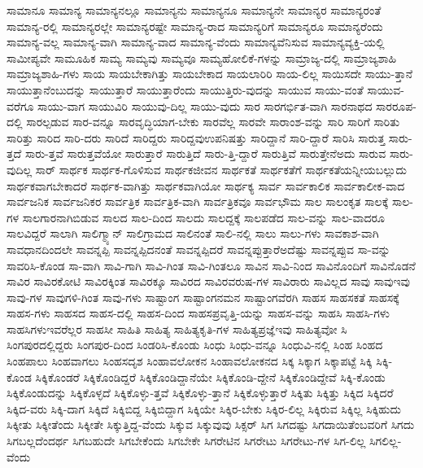 {ಸಾಮಾನೂ
ಸಾಮಾನ್ಯ
ಸಾಮಾನ್ಯನಲ್ಲೂ
ಸಾಮಾನ್ಯನು
ಸಾಮಾನ್ಯನೂ
ಸಾಮಾನ್ಯನೇ
ಸಾಮಾನ್ಯರ
ಸಾಮಾನ್ಯರಂತೆ
ಸಾಮಾನ್ಯ-ರಲ್ಲಿ
ಸಾಮಾನ್ಯರಲ್ಲೇ
ಸಾಮಾನ್ಯರಷ್ಟೇ
ಸಾಮಾನ್ಯ-ರಾದ
ಸಾಮಾನ್ಯರಿಗೆ
ಸಾಮಾನ್ಯರೂ
ಸಾಮಾನ್ಯರೆಂದು
ಸಾಮಾನ್ಯ-ವಲ್ಲ
ಸಾಮಾನ್ಯ-ವಾಗಿ
ಸಾಮಾನ್ಯ-ವಾದ
ಸಾಮಾನ್ಯ-ವೆಂದು
ಸಾಮಾನ್ಯವೆನಿಸುವ
ಸಾಮಾನ್ಯವ್ಯಕ್ತಿ-ಯಲ್ಲಿ
ಸಾಮೀಪ್ಯವೇ
ಸಾಮೂಹಿಕ
ಸಾಮ್ಯ
ಸಾಮ್ಯವು
ಸಾಮ್ಯವೂ
ಸಾಮ್ಯಹೋಲಿಕೆ-ಗಳನ್ನು
ಸಾಮ್ರಾಜ್ಯ-ದಲ್ಲಿ
ಸಾಮ್ರಾಜ್ಯಶಾಹಿ
ಸಾಮ್ರಾಜ್ಯಶಾಹಿ-ಗಳು
ಸಾಯ
ಸಾಯಬೇಕಾಗಿತ್ತು
ಸಾಯಬೇಕಾದ
ಸಾಯಲಾರಿರಿ
ಸಾಯ-ಲಿಲ್ಲ
ಸಾಯಿಸದೇ
ಸಾಯು-ತ್ತಾನೆ
ಸಾಯುತ್ತಾನೆಂಬುದನ್ನು
ಸಾಯುತ್ತಾರೆ
ಸಾಯುತ್ತಾರೆಂದು
ಸಾಯುತ್ತಿರು-ವುದನ್ನು
ಸಾಯುವ
ಸಾಯು-ವಂತೆ
ಸಾಯುವ-ವರೆಗೂ
ಸಾಯು-ವಾಗ
ಸಾಯುವಿರಿ
ಸಾಯುವು-ದಿಲ್ಲ
ಸಾಯು-ವುದು
ಸಾರ
ಸಾರಗರ್ಭಿತ-ವಾಗಿ
ಸಾರನಾಥದ
ಸಾರರೂಪ-ದಲ್ಲಿ
ಸಾರಲ್ಪಡುವ
ಸಾರ-ವನ್ನೂ
ಸಾರವೃದ್ಧಿಯಾಗ-ಬೇಕು
ಸಾರವೆಲ್ಲ
ಸಾರವೇ
ಸಾರಾಂಶ-ವನ್ನು
ಸಾರಿ
ಸಾರಿಗೆ
ಸಾರಿತು
ಸಾರಿತ್ತು
ಸಾರಿದ
ಸಾರಿ-ದರು
ಸಾರಿದೆ
ಸಾರಿದ್ದರು
ಸಾರಿದ್ದವುಉಪನಿಷತ್ತು
ಸಾರಿದ್ದಾನೆ
ಸಾರಿ-ದ್ದಾರೆ
ಸಾರಿಸಿ
ಸಾರುತ್ತ
ಸಾರು-ತ್ತದೆ
ಸಾರು-ತ್ತವೆ
ಸಾರುತ್ತವೆಯೋ
ಸಾರುತ್ತಾರೆ
ಸಾರುತ್ತಿದೆ
ಸಾರು-ತ್ತಿ-ದ್ದಾರೆ
ಸಾರುತ್ತಿವೆ
ಸಾರುತ್ತೇನೆಅದು
ಸಾರುವ
ಸಾರು-ವುದಿಲ್ಲ
ಸಾರ್
ಸಾರ್ಥಕ
ಸಾರ್ಥಕ-ಗೊಳಿಸುವ
ಸಾರ್ಥಕಜೀವನ
ಸಾರ್ಥಕತೆ
ಸಾರ್ಥಕತೆಗೆ
ಸಾರ್ಥಕತೆಯನ್ನೀಯಬಲ್ಲುದು
ಸಾರ್ಥಕವಾಗಬೇಕಾದರೆ
ಸಾರ್ಥಕ-ವಾಗಿತ್ತು
ಸಾರ್ಥಕವಾಗಿಯೋ
ಸಾರ್ಥಕ್ಯ
ಸಾರ್ವ
ಸಾರ್ವಕಾಲಿಕ
ಸಾರ್ವಕಾಲೀಕ-ವಾದ
ಸಾರ್ವಜನಿಕ
ಸಾರ್ವಜನಿಕರ
ಸಾರ್ವತ್ರಿಕ
ಸಾರ್ವತ್ರಿಕ-ವಾಗಿ
ಸಾರ್ವತ್ರಿಕವೂ
ಸಾರ್ವಭೌಮ
ಸಾಲ
ಸಾಲಂಕೃತ
ಸಾಲಕ್ಕೆ
ಸಾಲ-ಗಳ
ಸಾಲಗಾರನಾಗಿಬಿಡುವ
ಸಾಲದ
ಸಾಲ-ದಿಂದ
ಸಾಲದು
ಸಾಲದ್ದಕ್ಕೆ
ಸಾಲಪಡೆದ
ಸಾಲ-ವನ್ನು
ಸಾಲ-ವಾದರೂ
ಸಾಲವಿದ್ದರೆ
ಸಾಲಾಗಿ
ಸಾಲಿಗ್ಮ್ಯಾನ್
ಸಾಲಿಗ್ರಾಮದ
ಸಾಲಿನಂತೆ
ಸಾಲಿ-ನಲ್ಲಿ
ಸಾಲು
ಸಾಲು-ಗಳು
ಸಾವಕಾಶ-ವಾಗಿ
ಸಾವಧಾನದಿಂದಲೇ
ಸಾವನ್ನಪ್ಪಿ
ಸಾವನ್ನಪ್ಪಿದನಂತೆ
ಸಾವನ್ನಪ್ಪಿದರೆ
ಸಾವನ್ನಪ್ಪುತ್ತಾರೆಅದೆಷ್ಟು
ಸಾವನ್ನಪ್ಪುವ
ಸಾ-ವನ್ನು
ಸಾವರಿಸಿ-ಕೊಂಡ
ಸಾ-ವಾಗಿ
ಸಾವಿ-ಗಾಗಿ
ಸಾವಿ-ಗಿಂತ
ಸಾವಿ-ಗಿಂತಲೂ
ಸಾವಿನ
ಸಾವಿ-ನಿಂದ
ಸಾವಿನೊಂದಿಗೆ
ಸಾವಿನೊಡನೆ
ಸಾವಿರ
ಸಾವಿರಕೋಟಿ
ಸಾವಿರಕ್ಕಿಂತ
ಸಾವಿರಕ್ಕೂ
ಸಾವಿರದ
ಸಾವಿರವರುಷ-ಗಳ
ಸಾವಿರಾರು
ಸಾವಿಲ್ಲದ
ಸಾವು
ಸಾವುಇವು
ಸಾವು-ಗಳ
ಸಾವುಗಳಿ-ಗಿಂತ
ಸಾವು-ಗಳು
ಸಾಷ್ಟಾಂಗ
ಸಾಷ್ಟಾಂಗನಮನ
ಸಾಷ್ಟಾಂಗವೆರಗಿ
ಸಾಹಸ
ಸಾಹಸಕತೆ
ಸಾಹಸಕ್ಕೆ
ಸಾಹಸ-ಗಳು
ಸಾಹಸದ
ಸಾಹಸ-ದಲ್ಲಿ
ಸಾಹಸ-ದಿಂದ
ಸಾಹಸಪ್ರವೃತ್ತಿ-ಯನ್ನು
ಸಾಹಸ-ವನ್ನು
ಸಾಹಸಿ
ಸಾಹಸಿ-ಗಳು
ಸಾಹಸಿಗಳುಇವರೆಲ್ಲರ
ಸಾಹಸೀ
ಸಾಹಿತಿ
ಸಾಹಿತ್ಯ
ಸಾಹಿತ್ಯಕೃತಿ-ಗಳ
ಸಾಹಿತ್ಯಪ್ರಜ್ಞೆಇವು
ಸಾಹಿತ್ಯವೋ
ಸಿ
ಸಿಂಗಪುರದಲ್ಲಿದ್ದರು
ಸಿಂಗಪುರ-ದಿಂದ
ಸಿಂಡರಿಸಿ-ಕೊಂಡು
ಸಿಂಧು
ಸಿಂಧು-ವನ್ನೂ
ಸಿಂಧುವಿ-ನಲ್ಲಿ
ಸಿಂಹ
ಸಿಂಹದ
ಸಿಂಹಪಾಲು
ಸಿಂಹವಾಗಲು
ಸಿಂಹಸದೃಶ
ಸಿಂಹಾವಲೋಕನ
ಸಿಂಹಾವಲೋಕನದ
ಸಿಕ್ಕ
ಸಿಕ್ಕಾಗ
ಸಿಕ್ಕಾಪಟ್ಟೆ
ಸಿಕ್ಕಿ
ಸಿಕ್ಕಿ-ಕೊಂಡ
ಸಿಕ್ಕಿಕೊಂಡರೆ
ಸಿಕ್ಕಿಕೊಂಡಿದ್ದರೆ
ಸಿಕ್ಕಿಕೊಂಡಿದ್ದಾನೆಯೇ
ಸಿಕ್ಕಿಕೊಂಡಿ-ದ್ದೇನೆ
ಸಿಕ್ಕಿಕೊಂಡಿದ್ದೇವೆ
ಸಿಕ್ಕಿ-ಕೊಂಡು
ಸಿಕ್ಕಿಕೊಂಡುದನ್ನು
ಸಿಕ್ಕಿಕೊಳ್ಳದೆ
ಸಿಕ್ಕಿಕೊಳ್ಳು-ತ್ತವೆ
ಸಿಕ್ಕಿಕೊಳ್ಳು-ತ್ತಾನೆ
ಸಿಕ್ಕಿಕೊಳ್ಳುತ್ತಾರೆ
ಸಿಕ್ಕಿತು
ಸಿಕ್ಕಿತ್ತು
ಸಿಕ್ಕಿದ
ಸಿಕ್ಕಿದರೆ
ಸಿಕ್ಕಿದ-ವರು
ಸಿಕ್ಕಿ-ದಾಗ
ಸಿಕ್ಕಿದೆ
ಸಿಕ್ಕಿಬಿದ್ದ
ಸಿಕ್ಕಿಬಿದ್ದಾಗ
ಸಿಕ್ಕಿಯೇ
ಸಿಕ್ಕಿರ-ಬೇಕು
ಸಿಕ್ಕಿರ-ಲಿಲ್ಲ
ಸಿಕ್ಕಿರುವ
ಸಿಕ್ಕಿಲ್ಲ
ಸಿಕ್ಕಿಹುದು
ಸಿಕ್ಕೀತು
ಸಿಕ್ಕೀತೆಂದು
ಸಿಕ್ಕೀತೇ
ಸಿಕ್ಕುತ್ತಿದ್ದ-ವೆಂದು
ಸಿಕ್ಕುವ
ಸಿಕ್ಕುವುವು
ಸಿಕ್ಸರ್
ಸಿಗ
ಸಿಗದಷ್ಟು
ಸಿಗದಾಯಿತೆಂಬವರಿಗೆ
ಸಿಗದು
ಸಿಗಬಲ್ಲದೆಂದರ್ಥ
ಸಿಗಬಹುದೇ
ಸಿಗಬೇಕೆಂದು
ಸಿಗಬೇಕೇ
ಸಿಗರೇಟಿನ
ಸಿಗರೇಟು
ಸಿಗರೇಟು-ಗಳ
ಸಿಗ-ಲಿಲ್ಲ
ಸಿಗಲಿಲ್ಲ-ವೆಂದು
}
